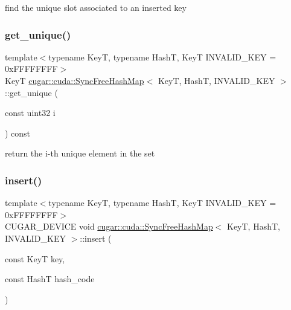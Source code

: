 find the unique slot associated to an inserted key \mbox{\label{structcugar_1_1cuda_1_1_sync_free_hash_map_aebddbad188e72e6f6bb5697f2e758d03}} 
\subsubsection{\texorpdfstring{get\+\_\+unique()}{get\_unique()}}
{\footnotesize\ttfamily template$<$typename KeyT, typename HashT, KeyT I\+N\+V\+A\+L\+I\+D\+\_\+\+K\+EY = 0x\+F\+F\+F\+F\+F\+F\+FF$>$ \\
KeyT \hyperlink{structcugar_1_1cuda_1_1_sync_free_hash_map}{cugar\+::cuda\+::\+Sync\+Free\+Hash\+Map}$<$ KeyT, HashT, I\+N\+V\+A\+L\+I\+D\+\_\+\+K\+EY $>$\+::get\+\_\+unique (\begin{DoxyParamCaption}\item[{const uint32}]{i }\end{DoxyParamCaption}) const\hspace{0.3cm}{\ttfamily [inline]}}

return the i-\/th unique element in the set \mbox{\label{structcugar_1_1cuda_1_1_sync_free_hash_map_aa3c8cdbaaeceb10563b073635b230d9c}} 
\subsubsection{\texorpdfstring{insert()}{insert()}\hspace{0.1cm}{\footnotesize\ttfamily [1/2]}}
{\footnotesize\ttfamily template$<$typename KeyT, typename HashT, KeyT I\+N\+V\+A\+L\+I\+D\+\_\+\+K\+EY = 0x\+F\+F\+F\+F\+F\+F\+FF$>$ \\
C\+U\+G\+A\+R\+\_\+\+D\+E\+V\+I\+CE void \hyperlink{structcugar_1_1cuda_1_1_sync_free_hash_map}{cugar\+::cuda\+::\+Sync\+Free\+Hash\+Map}$<$ KeyT, HashT, I\+N\+V\+A\+L\+I\+D\+\_\+\+K\+EY $>$\+::insert (\begin{DoxyParamCaption}\item[{const KeyT}]{key,  }\item[{const HashT}]{hash\+\_\+code }\end{DoxyParamCaption})\hspace{0.3cm}{\ttfamily [inline]}}

